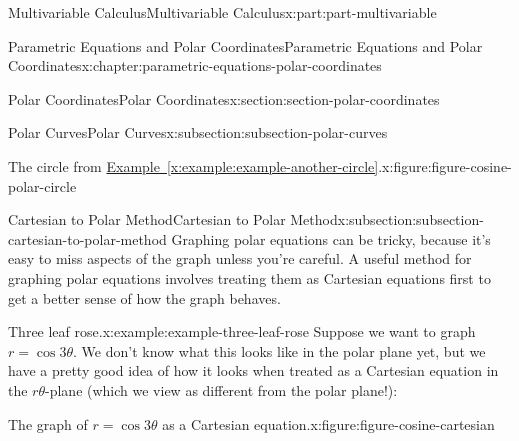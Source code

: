 \documentclass[twoside,10pt,]{tufte-book}
\newcommand{\xreffont}{\relax}
\numberwithin{equation}{part}
\begin{document}
\begin{partptx}{Multivariable Calculus}{}{Multivariable Calculus}{}{}{x:part:part-multivariable}
\begin{chapterptx}{Parametric Equations and Polar Coordinates}{}{Parametric Equations and Polar Coordinates}{}{}{x:chapter:parametric-equations-polar-coordinates}
\begin{sectionptx}{Polar Coordinates}{}{Polar Coordinates}{}{}{x:section:section-polar-coordinates}
\begin{subsectionptx}{Polar Curves}{}{Polar Curves}{}{}{x:subsection:subsection-polar-curves}
\begin{figureptx}{The circle from \hyperref[x:example:example-another-circle]{Example~{\xreffont\ref{x:example:example-another-circle}}}.}{x:figure:figure-cosine-polar-circle}{}
\begin{image}{0}{1}{0}
{
}%
\end{image}%
\tcblower
\end{figureptx}%
\end{subsectionptx}
%
%
\typeout{************************************************}
\typeout{************************************************}
%
\begin{subsectionptx}{Cartesian to Polar Method}{}{Cartesian to Polar Method}{}{}{x:subsection:subsection-cartesian-to-polar-method}
Graphing polar equations can be tricky, because it's easy to miss aspects of the graph unless you're careful. A useful method for graphing polar equations involves treating them as Cartesian equations first to get a better sense of how the graph behaves.%
\begin{example}{Three leaf rose.}{x:example:example-three-leaf-rose}%
Suppose we want to graph \(r = \cos3\theta\). We don't know what this looks like in the polar plane yet, but we have a pretty good idea of how it looks when treated as a Cartesian equation in the \(r\theta\)-plane (which we view as different from the polar plane!):%
\begin{figureptx}{The graph of \(r=\cos3\theta\) as a Cartesian equation.}{x:figure:figure-cosine-cartesian}{}%
\begin{image}{0}{1}{0}%
\end{image}
\end{figureptx}
\end{example}
\end{subsectionptx}
\end{sectionptx}
\end{chapterptx}
\end{partptx}
\end{document}
